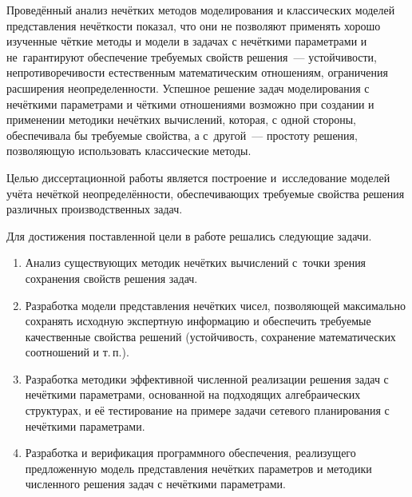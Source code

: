 Проведённый анализ нечётких методов моделирования и классических моделей представления нечёткости показал, что они не позволяют применять хорошо изученные чёткие методы и модели в задачах с нечёткими параметрами и не~гарантируют обеспечение требуемых свойств решения~--- устойчивости, непротиворечивости естественным математическим отношениям, ограничения расширения неопределенности. Успешное решение задач моделирования с нечёткими параметрами и чёткими отношениями возможно при создании и применении методики нечётких вычислений, которая, с одной стороны, обеспечивала бы требуемые свойства, а с~другой~--- простоту решения, позволяющую использовать классические методы.

Целью диссертационной работы является построение и~исследование моделей учёта нечёткой неопределённости, обеспечивающих требуемые свойства решения различных производственных задач.

Для достижения поставленной цели в работе решались следующие задачи.
\begin{enumerate}
  \item Анализ существующих методик нечётких вычислений с~точки зрения сохранения свойств решения задач.
  \item Разработка модели представления нечётких чисел, позволяющей максимально сохранять исходную экспертную информацию и обеспечить требуемые качественные свойства решений (устойчивость, сохранение математических соотношений и т.\,п.).
  \item Разработка методики эффективной численной реализации решения задач с нечёткими параметрами, основанной на подходящих алгебраических структурах, и её тестирование на примере задачи сетевого планирования с нечёткими параметрами.
  \item Разработка и верификация программного обеспечения, реализущего предложенную модель представления нечётких параметров и методики численного решения задач с нечёткими параметрами.
\end{enumerate}